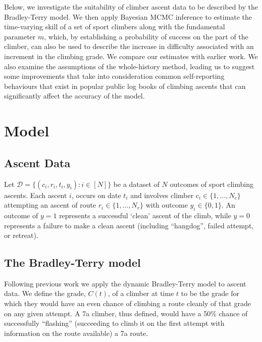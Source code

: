 \documentclass{article}
\begin{document}
{Below, we investigate the suitability of climber ascent data to be described by the Bradley-Terry model.  We then apply Bayesian MCMC inference to estimate the time-varying skill of a set of sport climbers along with the fundamental parameter $m$, which, by establishing a probability of success on the part of the climber, can also be used to describe the increase in difficulty associated with an increment in the climbing grade.  We compare our estimates with earlier work.  We also examine the assumptions of the whole-history method, leading us to suggest some improvements that take into consideration common self-reporting behaviours that exist in popular public log books of climbing ascents that can significantly affect the accuracy of the model.

\section*{Model}

\subsection*{Ascent Data}

Let $\mathcal{D} = \{(c_i, r_i, t_i, y_i) : i \in [N]\}$ be a dataset of $N$ outcomes of sport climbing ascents.  Each ascent $i$, occurs on date $t_i$ and involves climber $c_i \in \{1,\dots, N_c\}$ attempting an ascent of route $r_i \in \{1,\dots, N_r\}$ with outcome $y_i \in \{0,1\}$. An outcome of $y=1$ represents a successful `clean' ascent of the climb, while $y=0$ represents a failure to make a clean ascent (including ``\gls{hangdog}'', failed attempt, or retreat). 

\subsection*{The Bradley-Terry model}

Following previous work  \cite{scarff2020estimation} we apply the dynamic Bradley-Terry model \cite{zermelo1929berechnung,bradley1952rank} to ascent data. We define the grade, $C(t)$, of a climber at time $t$ to be the grade for which they would have an even chance of climbing a route cleanly of that grade on any given attempt. A 7a climber, thus defined, would have a 50\% chance of successfully ``flashing'' (succeeding to climb it on the first attempt with information on the route available) a 7a route. 

}
\end{document}

